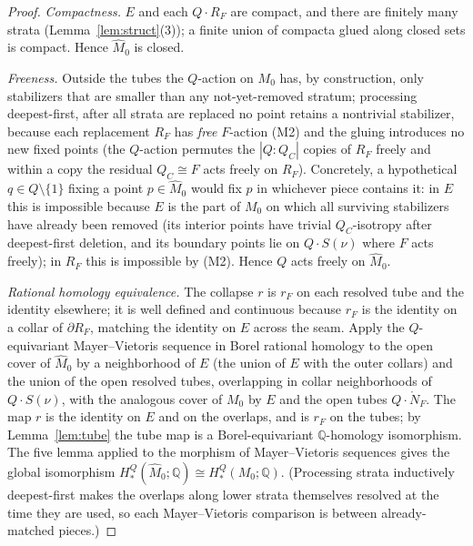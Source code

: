 \documentclass[12pt]{article}
\theoremstyle{definition}
\begin{document}
\begin{proof}
\emph{Compactness.} $E$ and each $Q\cdot R_F$ are compact, and there are
finitely many strata (Lemma~\ref{lem:struct}(3)); a finite union of compacta
glued along closed sets is compact. Hence $\widehat M_0$ is closed.

\emph{Freeness.} Outside the tubes the $Q$-action on $M_0$ has, by construction,
only stabilizers that are smaller than any not-yet-removed stratum; processing
deepest-first, after all strata are replaced no point retains a nontrivial
stabilizer, because each replacement $R_F$ has \emph{free} $F$-action (M2) and
the gluing introduces no new fixed points (the $Q$-action permutes the $|Q:Q_C|$
copies of $R_F$ freely and within a copy the residual $Q_C\cong F$ acts freely on
$R_F$). Concretely, a hypothetical $q\in Q\setminus\{1\}$ fixing a point
$p\in\widehat M_0$ would fix $p$ in whichever piece contains it: in $E$ this is
impossible because $E$ is the part of $M_0$ on which all surviving stabilizers
have already been removed (its interior points have trivial $Q_C$-isotropy after
deepest-first deletion, and its boundary points lie on $Q\cdot S(\nu)$ where $F$
acts freely); in $R_F$ this is impossible by (M2). Hence $Q$ acts freely on
$\widehat M_0$.

\emph{Rational homology equivalence.} The collapse $r$ is $r_F$ on each resolved
tube and the identity elsewhere; it is well defined and continuous because $r_F$
is the identity on a collar of $\partial R_F$, matching the identity on $E$
across the seam. Apply the $Q$-equivariant Mayer--Vietoris
sequence in Borel rational homology to the open cover of $\widehat M_0$ by a
neighborhood of $E$ (the union of $E$ with the outer collars) and the union of
the open resolved tubes, overlapping in collar neighborhoods of
$Q\cdot S(\nu)$, with the analogous cover of $M_0$ by $E$ and the open tubes
$Q\cdot\mathring N_F$. The map $r$ is the
identity on $E$ and on the overlaps, and is $r_F$ on the tubes; by
Lemma~\ref{lem:tube} the tube map is a Borel-equivariant $\mathbb{Q}$-homology
isomorphism. The five lemma applied to the morphism of Mayer--Vietoris sequences
gives the global isomorphism $H^Q_*(\widehat M_0;\mathbb{Q})\cong
H^Q_*(M_0;\mathbb{Q})$. (Processing strata inductively deepest-first makes the
overlaps along lower strata themselves resolved at the time they are used, so
each Mayer--Vietoris comparison is between already-matched pieces.)
\end{proof}
\end{document}
